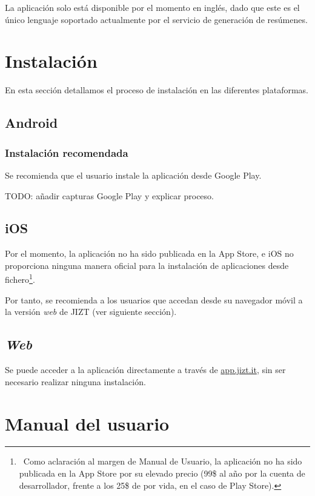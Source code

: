 La aplicación solo está disponible por el momento en inglés, dado que este es el único lenguaje soportado actualmente por el servicio de generación de resúmenes.

\section{Instalación}

En esta sección detallamos el proceso de instalación en las diferentes plataformas.

\subsection{Android}

\subsubsection{Instalación recomendada}

Se recomienda que el usuario instale la aplicación desde Google Play.

TODO: añadir capturas Google Play y explicar proceso.

\subsection{iOS}

Por el momento, la aplicación no ha sido publicada en la App Store, e iOS no proporciona ninguna manera oficial para la instalación de aplicaciones desde fichero\footnote{\, Como aclaración al margen de Manual de Usuario, la aplicación no ha sido publicada en la App Store por su elevado precio (99\$ al año por la cuenta de desarrollador, frente a los 25\$ de por vida, en el caso de Play Store).}.

Por tanto, se recomienda a los usuarios que accedan desde su navegador móvil a la versión \emph{web} de JIZT (ver siguiente sección).

\subsection{\emph{Web}}

Se puede acceder a la aplicación directamente a través de \href{https://app.jizt.it}{app.jizt.it}, sin ser necesario realizar ninguna instalación.

\newpage

\section{Manual del usuario}

